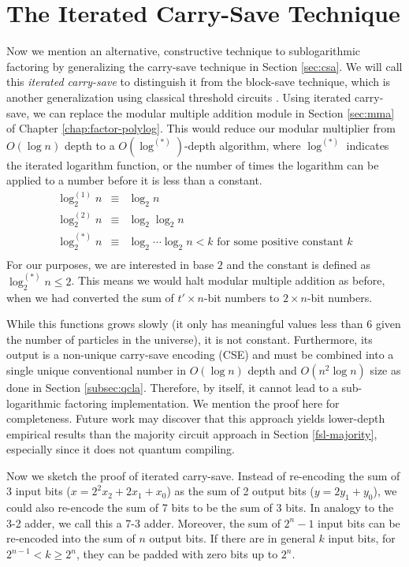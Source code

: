 \section{The Iterated Carry-Save Technique}
\label{sec:blocksave}

Now we mention an alternative, constructive technique to sublogarithmic
factoring by generalizing
the carry-save technique in Section \ref{sec:csa}. We will call this
\emph{iterated carry-save} to distinguish it from the block-save
technique, which is another generalization using classical threshold
circuits \cite{Siu1993}.
Using iterated carry-save, we can replace the modular multiple addition module in
Section \ref{sec:mma} of Chapter \ref{chap:factor-polylog}. This
would reduce our modular multiplier from $O(\log n)$ depth to 
a $O(\log^{(*)})$-depth algorithm, where $\log^{(*)}$ indicates
the iterated logarithm function, or the number of times the
logarithm can be applied to a number before it is less than a
constant.
\begin{eqnarray}
\log^{(1)}_2 n & \equiv & \log_2 n \\
\log^{(2)}_2 n & \equiv & \log_2\log_2 n \\
\log^{(*)}_2 n & \equiv & \log_2 \cdots \log_2 n < k \text{ for some positive constant } k\\
\end{eqnarray}
For our purposes, we are interested in base $2$ and
the constant is defined as $\log^{(*)}_2 n \le 2$. This
means we would halt modular multiple addition as before, when we
had converted the sum of $t'\times n$-bit numbers to $2 \times n$-bit numbers.

While this functions grows
slowly (it only has meaningful values less than
$6$ given the number of particles in the universe), it is not
constant. Furthermore, its output is a non-unique carry-save encoding (CSE)
and must be combined into a single unique conventional number in
$O(\log n)$ depth and $O(n^2 \log n)$ size as done in Section \ref{subsec:qcla}.
Therefore, by itself, it cannot lead to a sub-logarithmic factoring
implementation.
We mention the proof here for completeness. Future work
may discover that this approach yields lower-depth empirical
results than the majority circuit approach in Section \ref{fsl-majority},
especially since it does not quantum compiling.

Now we sketch the proof of iterated carry-save.
Instead of re-encoding the sum of 3 input bits ($x = 2^2 x_2 + 2 x_1  + x_0$)
as the sum of 2 output bits ($y = 2 y_1 + y_0$),
we could also re-encode the sum of 7 bits to be the
sum of 3 bits. In analogy to the 3-2 adder, we call this a 7-3 adder.
Moreover, the sum of $2^n - 1$ input bits can be re-encoded into the sum
of $n$ output bits. If there are in general $k$ input bits, for $2^{n-1} < k \ge 2^n$,
they can be padded with zero bits up to $2^n$.


